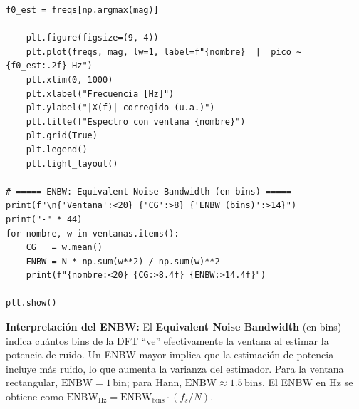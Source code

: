 \documentclass[11pt, a4paper]{article}
\begin{document}
\begin{lstlisting}[style=pythonstyle, caption={ventanas\_analisis.py}]
    f0_est = freqs[np.argmax(mag)]

    plt.figure(figsize=(9, 4))
    plt.plot(freqs, mag, lw=1, label=f"{nombre}  |  pico ~ {f0_est:.2f} Hz")
    plt.xlim(0, 1000)
    plt.xlabel("Frecuencia [Hz]")
    plt.ylabel("|X(f)| corregido (u.a.)")
    plt.title(f"Espectro con ventana {nombre}")
    plt.grid(True)
    plt.legend()
    plt.tight_layout()

# ===== ENBW: Equivalent Noise Bandwidth (en bins) =====
print(f"\n{'Ventana':<20} {'CG':>8} {'ENBW (bins)':>14}")
print("-" * 44)
for nombre, w in ventanas.items():
    CG   = w.mean()
    ENBW = N * np.sum(w**2) / np.sum(w)**2
    print(f"{nombre:<20} {CG:>8.4f} {ENBW:>14.4f}")

plt.show()
\end{lstlisting}

\begin{hintbox}
\textbf{Interpretaci\'on del ENBW:}
El \textbf{Equivalent Noise Bandwidth} (en bins) indica cu\'antos bins de la DFT
``ve'' efectivamente la ventana al estimar la potencia de ruido.
Un ENBW mayor implica que la estimaci\'on de potencia incluye m\'as ruido,
lo que aumenta la varianza del estimador.
Para la ventana rectangular, $\text{ENBW} = 1\,\text{bin}$;
para Hann, $\text{ENBW} \approx 1.5\,\text{bins}$.
El ENBW en Hz se obtiene como $\text{ENBW}_{\text{Hz}} = \text{ENBW}_{\text{bins}} \cdot (f_s / N)$.
\end{hintbox}
\end{document}
